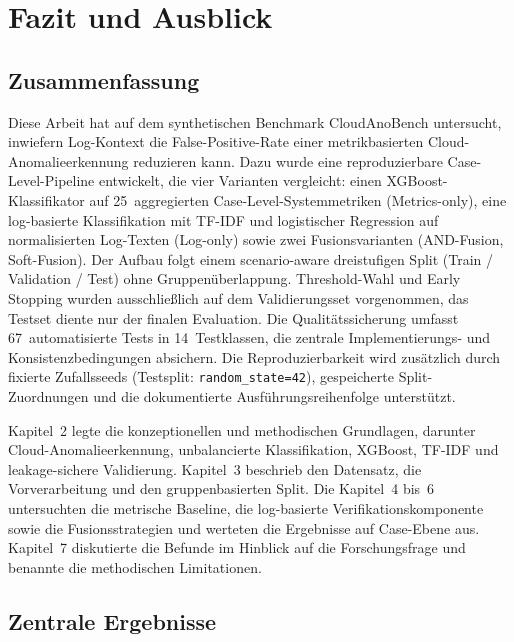 
\section{Fazit und Ausblick}

\subsection{Zusammenfassung}

Diese Arbeit hat auf dem synthetischen Benchmark CloudAnoBench untersucht,
inwiefern Log-Kontext die False-Positive-Rate einer metrikbasierten
Cloud-Ano\-malie\-er\-kennung reduzieren kann. Dazu wurde eine reproduzierbare
Case-Level-Pipeline entwickelt, die vier Varianten vergleicht: einen
XGBoost-Klassifikator auf 25~aggregierten Case-Level-Systemmetriken
(Metrics-only), eine log-basierte Klassifikation mit TF-IDF und logistischer
Regression auf normalisierten Log-Texten (Log-only) sowie zwei
Fusionsvarianten (AND-Fusion, Soft-Fusion). Der Aufbau folgt einem
scenario-aware dreistufigen Split (Train / Validation / Test) ohne
Gruppenüberlappung. Threshold-Wahl und Early Stopping wurden ausschließlich
auf dem Validierungsset vorgenommen, das Testset diente nur der finalen
Evaluation. Die Qualitätssicherung umfasst 67~automatisierte Tests in 14~Testklassen, die
zentrale Implementierungs- und Konsistenzbedingungen absichern. Die Reproduzierbarkeit wird zusätzlich durch fixierte
Zufallsseeds (Testsplit: \texttt{random\_state=42}), gespeicherte Split-Zuordnungen
und die dokumentierte Ausführungsreihenfolge unterstützt.

Kapitel~2 legte die konzeptionellen und methodischen Grundlagen, darunter
Cloud-Anomalieerkennung, unbalancierte Klassifikation, XGBoost, TF-IDF und
leakage-sichere Validierung. Kapitel~3 beschrieb den Datensatz, die Vorverarbeitung
und den gruppenbasierten Split. Die Kapitel~4 bis~6 untersuchten die metrische
Baseline, die log-basierte Verifikationskomponente sowie die Fusionsstrategien und
werteten die Ergebnisse auf Case-Ebene aus. Kapitel~7 diskutierte die Befunde im
Hinblick auf die Forschungsfrage und benannte die methodischen Limitationen.

\subsection{Zentrale Ergebnisse}

